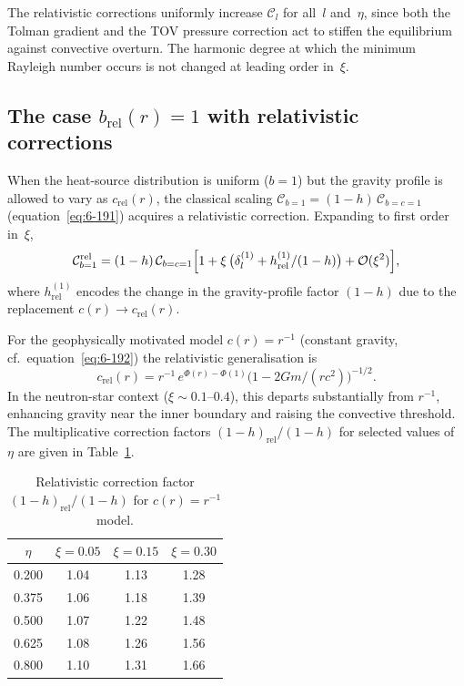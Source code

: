 The relativistic corrections uniformly increase $\mathcal{C}_{l}$ for
all~$l$ and~$\eta$, since both the Tolman gradient and the TOV
pressure correction act to stiffen the equilibrium against convective
overturn.  The harmonic degree at which the minimum Rayleigh number
occurs is not changed at leading order in~$\xi$.

\subsection{The case $b_{\mathrm{rel}}(r) = 1$ with relativistic
  corrections}\label{sec:rel-60b}

When the heat-source distribution is uniform ($b=1$) but the gravity
profile is allowed to vary as $c_{\mathrm{rel}}(r)$, the classical
scaling $\mathcal{C}_{b=1}=(1-h)\,\mathcal{C}_{b=c=1}$
(equation~\eqref{eq:6-191}) acquires a relativistic correction.  Expanding
to first order in~$\xi$,
\begin{equation}\label{eq:rel-60-29}
\mathcal{C}_{b=1}^{\mathrm{rel}}
  = (1 - h)\,\mathcal{C}_{b=c=1}
  \Bigl[1 + \xi\,\bigl(\delta_{l}^{(1)}
  + h_{\mathrm{rel}}^{(1)}/(1-h)\bigr)
  + \mathcal{O}(\xi^{2})\Bigr],
\end{equation}
where $h_{\mathrm{rel}}^{(1)}$ encodes the change in the gravity-profile
factor $(1-h)$ due to the replacement $c(r)\to c_{\mathrm{rel}}(r)$.

For the geophysically motivated model $c(r)=r^{-1}$ (constant
gravity, cf.\ equation~\eqref{eq:6-192}) the relativistic generalisation is
\begin{equation}\label{eq:rel-60-30}
c_{\mathrm{rel}}(r) = r^{-1}\,e^{\Phi(r)-\Phi(1)}
  \bigl(1-2Gm/(rc^{2})\bigr)^{-1/2}.
\end{equation}
In the neutron-star context ($\xi\sim 0.1$--$0.4$), this departs
substantially from $r^{-1}$, enhancing gravity near the inner
boundary and raising the convective threshold.  The multiplicative
correction factors $(1-h)_{\mathrm{rel}}/(1-h)$ for selected values
of~$\eta$ are given in Table~\ref{tab:rel-XXVII}.

\begin{table}[ht]
\centering
\caption{Relativistic correction factor $(1-h)_{\mathrm{rel}}/(1-h)$
for $c(r) = r^{-1}$ model.}\label{tab:rel-XXVII}
\begin{tabular}{c c c c}
\hline
$\eta$ & $\xi = 0.05$ & $\xi = 0.15$ & $\xi = 0.30$ \\
\hline
0.200 & 1.04 & 1.13 & 1.28 \\
0.375 & 1.06 & 1.18 & 1.39 \\
0.500 & 1.07 & 1.22 & 1.48 \\
0.625 & 1.08 & 1.26 & 1.56 \\
0.800 & 1.10 & 1.31 & 1.66 \\
\hline
\end{tabular}
\end{table}

